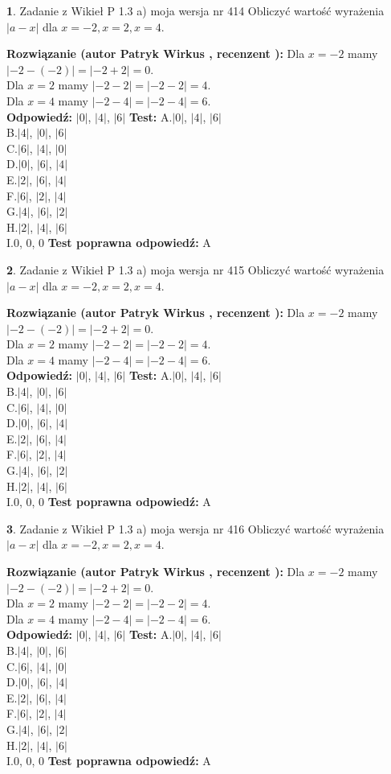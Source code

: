 \documentclass[12pt, a4paper]{article}
\theoremstyle{definition} %
\newtheorem{zad}{}
\newcommand{\zadStart}[1]{\begin{zad}#1\newline}
\newcommand{\zadStop}{\end{zad}}
\newcommand{\rozwStart}[2]{\noindent \textbf{Rozwiązanie (autor #1 , recenzent #2): }\newline}
\newcommand{\rozwStop}{\newline}
\newcommand{\odpStart}{\noindent \textbf{Odpowiedź:}\newline}
\newcommand{\odpStop}{\newline}
\newcommand{\testStart}{\noindent \textbf{Test:}\newline}
\newcommand{\testStop}{\newline}
\newcommand{\kluczStart}{\noindent \textbf{Test poprawna odpowiedź:}\newline}
\newcommand{\kluczStop}{\newline}
\begin{document}
\zadStart{Zadanie z Wikieł P 1.3 a) moja wersja nr 414}
Obliczyć wartość wyrażenia $|a - x|$ dla $x=-2,x=2,x=4$.
\zadStop
\rozwStart{Patryk Wirkus}{}
Dla $x = -2$ mamy $|-2 - (-2)| = |-2 + 2| = 0$.\\
Dla $x = 2$ mamy $|-2 - 2| = |-2 - 2| = 4$.\\
Dla $x = 4$ mamy $|-2 - 4| = |-2 - 4| = 6$.\\
\rozwStop
\odpStart
$|0|$, $|4|$, $|6|$
\odpStop
\testStart
A.$|0|$, $|4|$, $|6|$\\
B.$|4|$, $|0|$, $|6|$\\
C.$|6|$, $|4|$, $|0|$\\
D.$|0|$, $|6|$, $|4|$\\
E.$|2|$, $|6|$, $|4|$\\
F.$|6|$, $|2|$, $|4|$\\
G.$|4|$, $|6|$, $|2|$\\
H.$|2|$, $|4|$, $|6|$\\
I.$0$, $0$, $0$
\testStop
\kluczStart
A
\kluczStop



\zadStart{Zadanie z Wikieł P 1.3 a) moja wersja nr 415}
Obliczyć wartość wyrażenia $|a - x|$ dla $x=-2,x=2,x=4$.
\zadStop
\rozwStart{Patryk Wirkus}{}
Dla $x = -2$ mamy $|-2 - (-2)| = |-2 + 2| = 0$.\\
Dla $x = 2$ mamy $|-2 - 2| = |-2 - 2| = 4$.\\
Dla $x = 4$ mamy $|-2 - 4| = |-2 - 4| = 6$.\\
\rozwStop
\odpStart
$|0|$, $|4|$, $|6|$
\odpStop
\testStart
A.$|0|$, $|4|$, $|6|$\\
B.$|4|$, $|0|$, $|6|$\\
C.$|6|$, $|4|$, $|0|$\\
D.$|0|$, $|6|$, $|4|$\\
E.$|2|$, $|6|$, $|4|$\\
F.$|6|$, $|2|$, $|4|$\\
G.$|4|$, $|6|$, $|2|$\\
H.$|2|$, $|4|$, $|6|$\\
I.$0$, $0$, $0$
\testStop
\kluczStart
A
\kluczStop



\zadStart{Zadanie z Wikieł P 1.3 a) moja wersja nr 416}
Obliczyć wartość wyrażenia $|a - x|$ dla $x=-2,x=2,x=4$.
\zadStop
\rozwStart{Patryk Wirkus}{}
Dla $x = -2$ mamy $|-2 - (-2)| = |-2 + 2| = 0$.\\
Dla $x = 2$ mamy $|-2 - 2| = |-2 - 2| = 4$.\\
Dla $x = 4$ mamy $|-2 - 4| = |-2 - 4| = 6$.\\
\rozwStop
\odpStart
$|0|$, $|4|$, $|6|$
\odpStop
\testStart
A.$|0|$, $|4|$, $|6|$\\
B.$|4|$, $|0|$, $|6|$\\
C.$|6|$, $|4|$, $|0|$\\
D.$|0|$, $|6|$, $|4|$\\
E.$|2|$, $|6|$, $|4|$\\
F.$|6|$, $|2|$, $|4|$\\
G.$|4|$, $|6|$, $|2|$\\
H.$|2|$, $|4|$, $|6|$\\
I.$0$, $0$, $0$
\testStop
\kluczStart
A
\kluczStop
\end{document}
